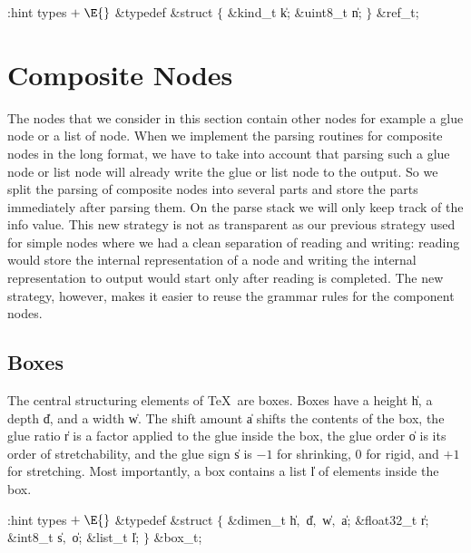 

\Y\B\4:hint types\X${}\mathrel+\E{}$\6
\&{typedef} \&{struct} ${}\{{}$\5
\1\&{kind\_t} \|k;\5
\&{uint8\_t} \|n;\5
\2${}\}{}$ \&{ref\_t};
\Y
\fi



\section{Composite Nodes}\hascode
\label{composite}
The nodes that we consider in this section contain other nodes for example
a glue node or a list of node. When we implement the parsing routines
for composite nodes in the long format, we have to take into account
that parsing such a glue node or list node  will already write the glue or list node
to the output. So we split the parsing of composite nodes into several parts
and store the parts immediately after parsing them. On the parse stack we will only
keep track of the info value.
This new strategy is not as transparent as  our previous strategy used for
simple nodes where we had a clean separation of reading and writing:
reading would store the internal representation of a node and writing the internal
representation to output would start only after reading is completed.
The new strategy, however, makes it easier to reuse
the grammar rules for the component nodes.

\subsection{Boxes}
The central structuring elements of \TeX\ are boxes.
Boxes have a height \|h, a depth \|d, and a width \|w.
The shift amount \|a shifts the contents of the box, the glue ratio \|r is a factor
applied to the glue inside the box, the glue order \|o is its order of stretchability,
and the glue sign \|s is $-1$ for shrinking, 0 for rigid, and $+1$ for stretching.
Most importantly, a box contains a list \|l of elements inside the box.


\Y\B\4:hint types\X${}\mathrel+\E{}$\6
\&{typedef} \&{struct}\6
${}\{{}$\5
\1\&{dimen\_t} \|h${},{}$ \|d${},{}$ \|w${},{}$ \|a;\5
\&{float32\_t} \|r;\5
\&{int8\_t} \|s${},{}$ \|o;\5
\&{list\_t} \|l;\5
\2${}\}{}$ \&{box\_t};
\Y
\fi


